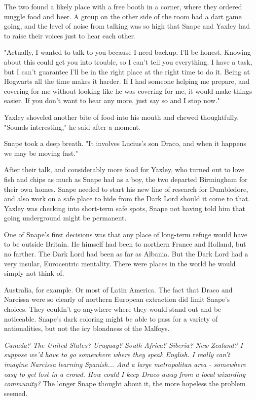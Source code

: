 The two found a likely place with a free booth in a corner, where they ordered muggle food and beer. A group on the other side of the room had a dart game going, and the level of noise from talking was so high that Snape and Yaxley had to raise their voices just to hear each other.

"Actually, I wanted to talk to you because I need backup. I'll be honest. Knowing about this could get you into trouble, so I can't tell you everything. I have a task, but I can't guarantee I'll be in the right place at the right time to do it. Being at Hogwarts all the time makes it harder. If I had someone helping me prepare, and covering for me without looking like he was covering for me, it would make things easier. If you don't want to hear any more, just say so and I stop now."

Yaxley shoveled another bite of food into his mouth and chewed thoughtfully. "Sounds interesting," he said after a moment.

Snape took a deep breath. "It involves Lucius's son Draco, and when it happens we may be moving fast."

After their talk, and considerably more food for Yaxley, who turned out to love fish and chips as much as Snape had as a boy, the two departed Birmingham for their own homes. Snape needed to start his new line of research for Dumbledore, and also work on a safe place to hide from the Dark Lord should it come to that. Yaxley was checking into short-term safe spots, Snape not having told him that going underground might be permanent.

One of Snape's first decisions was that any place of long-term refuge would have to be outside Britain. He himself had been to northern France and Holland, but no farther. The Dark Lord had been as far as Albania. But the Dark Lord had a very insular, Eurocentric mentality. There were places in the world he would simply not think of.

Australia, for example. Or most of Latin America. The fact that Draco and Narcissa were so clearly of northern European extraction did limit Snape's choices. They couldn't go anywhere where they would stand out and be noticeable. Snape's dark coloring might be able to pass for a variety of nationalities, but not the icy blondness of the Malfoys.

\emph{Canada? The United States? Uruguay? South Africa? Siberia? New Zealand? I suppose we'd have to go somewhere where they speak English. I really can't imagine Narcissa learning Spanish... And a large metropolitan area - somewhere easy to get lost in a crowd. How could I keep Draco away from a local wizarding community?} The longer Snape thought about it, the more hopeless the problem seemed.

